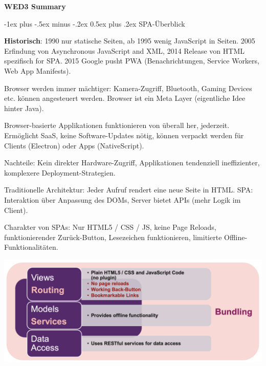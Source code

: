 \documentclass[10pt,landscape]{article}
\makeatletter
\renewcommand{\section}{\@startsection{section}{1}{0mm}%
{-1ex plus -.5ex minus -.2ex}%
{0.5ex plus .2ex}%
{\normalfont\large\bfseries}}
\makeatother
\begin{document}
    \raggedright
    \footnotesize
    \begin{multicols}{2}


        \setlength{\premulticols}{1pt}
        \setlength{\postmulticols}{1pt}
        \setlength{\multicolsep}{1pt}
        \setlength{\columnsep}{2pt}

        \begin{center}
            \Large{\textbf{WED3 Summary}} \\
        \end{center}


        \section{SPA-Überblick}

        \textbf{Historisch}: 1990 nur statische Seiten, ab 1995 wenig JavaScript in Seiten.
        2005 Erfindung von Asynchronous JavaScript and XML, 2014 Release von HTML spezifisch for SPA.
        2015 Google pusht PWA (Benachrichtungen, Service Workers, Web App Manifests).

        Browser werden immer mächtiger: Kamera-Zugriff, Bluetooth, Gaming Devices etc. können angesteuert werden.
        Browser ist ein Meta Layer (eigentliche Idee hinter Java).

        Browser-basierte Applikationen funktionieren von überall her, jederzeit.
        Ermöglicht SaaS, keine Software-Updates nötig, können verpackt werden für Clients (Electron) oder Apps (NativeScript).

        Nachteile: Kein direkter Hardware-Zugriff, Applikationen tendenziell ineffizienter, komplexere Deployment-Strategien.

        Traditionelle Architektur: Jeder Aufruf rendert eine neue Seite in HTML.
        SPA: Interaktion über Anpassung des DOMs, Server bietet APIs (mehr Logik im Client).

        Charakter von SPAs: Nur HTML5 / CSS / JS, keine Page Reloads, funktionierender Zurück-Button, Lesezeichen funktionieren, limitierte Offline-Funktionalitäten.

        \includegraphics[width=\linewidth]{spa_logical_overview}


\end{multicols}
\end{document}

